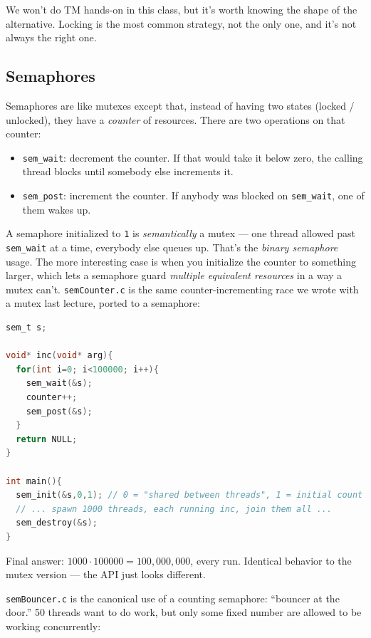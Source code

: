\documentclass[11pt]{article}
\begin{document}
We won't do TM hands-on in this class, but it's worth knowing the
shape of the alternative. Locking is the most common strategy, not
the only one, and it's not always the right one.

\subsection*{Semaphores}

Semaphores are like mutexes except that, instead of having two states
(locked / unlocked), they have a \emph{counter} of resources. There
are two operations on that counter:
\begin{itemize}
  \item \texttt{sem\_wait}: decrement the counter. If that would take
    it below zero, the calling thread blocks until somebody else
    increments it.
  \item \texttt{sem\_post}: increment the counter. If anybody was
    blocked on \texttt{sem\_wait}, one of them wakes up.
\end{itemize}

A semaphore initialized to \texttt{1} is \emph{semantically} a mutex
--- one thread allowed past \texttt{sem\_wait} at a time, everybody
else queues up. That's the \emph{binary semaphore} usage. The more
interesting case is when you initialize the counter to something
larger, which lets a semaphore guard \emph{multiple equivalent
resources} in a way a mutex can't.
\texttt{semCounter.c} is the same counter-incrementing race we wrote
with a mutex last lecture, ported to a semaphore:

\begin{lstlisting}[language=C]
sem_t s;

void* inc(void* arg){
  for(int i=0; i<100000; i++){
    sem_wait(&s);
    counter++;
    sem_post(&s);
  }
  return NULL;
}

int main(){
  sem_init(&s,0,1); // 0 = "shared between threads", 1 = initial count
  // ... spawn 1000 threads, each running inc, join them all ...
  sem_destroy(&s);
}
\end{lstlisting}

Final answer: \(1000 \cdot 100000 = 100{,}000{,}000\), every run.
Identical behavior to the mutex version --- the API just looks
different.

\texttt{semBouncer.c} is the canonical use of a counting semaphore:
``bouncer at the door.'' 50 threads want to do work, but only some
fixed number are allowed to be working concurrently:
\end{document}
